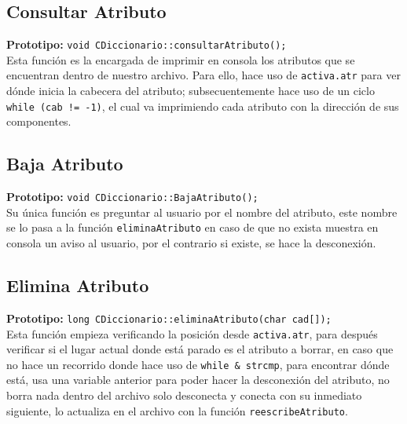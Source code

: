 \documentclass[12pt]{article}
\begin{document}
{}
\subsection*{Consultar Atributo}
\textbf{Prototipo:} \verb|void CDiccionario::consultarAtributo();|\\
Esta función es la encargada de imprimir en consola los 
atributos que se encuentran dentro de nuestro archivo. 
Para ello, hace uso de \verb|activa.atr| para ver dónde 
inicia la cabecera del atributo; subsecuentemente hace uso 
de un ciclo \verb|while (cab != -1)|, el cual va imprimiendo 
cada atributo con la dirección de sus componentes.

{}
\subsection*{Baja Atributo}
\textbf{Prototipo:} \verb|void CDiccionario::BajaAtributo();|\\
Su única función es preguntar al usuario por el nombre del 
atributo, este nombre se lo pasa a la función 
\verb|eliminaAtributo| en caso de que no exista muestra en 
consola un aviso al usuario, por el contrario si existe, se 
hace la desconexión.

{}
\subsection*{Elimina Atributo}
\textbf{Prototipo:} \verb|long CDiccionario::eliminaAtributo(char cad[]);|\\
Esta función empieza verificando la posición desde 
\verb|activa.atr|, para después verificar si el lugar actual 
donde está parado es el atributo a borrar, en caso que no 
hace un recorrido donde hace uso de \verb|while & strcmp|, 
para encontrar dónde está, usa una variable anterior para 
poder hacer la desconexión del atributo, no borra nada dentro 
del archivo solo desconecta y conecta con su inmediato 
siguiente, lo actualiza en el archivo con la función 
\verb|reescribeAtributo|.

\end{document}
